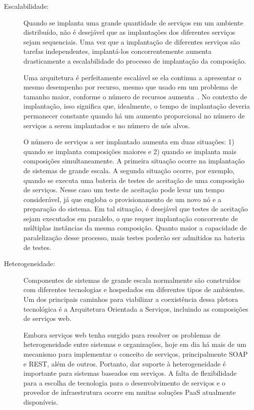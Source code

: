 \begin{description}
\item [Escalabilidade:]

Quando se implanta uma grande quantidade de serviços em um ambiente distribuído,
não é desejável que as implantações dos diferentes serviços sejam sequenciais.
Uma vez que a implantação de diferentes serviços são tarefas independentes,
implantá-los concorrentemente aumenta drasticamente a escalabilidade
do processo de implantação da composição.

Uma arquitetura é perfeitamente escalável
se ela continua a apresentar o mesmo desempenho por recurso,
mesmo que usado em um problema de tamanho maior, conforme o número
de recursos aumenta~\cite{Quinn1994Scalability}.
No contexto de implantação, isso significa que, idealmente,
o tempo de implantação deveria permanecer constante quando há um
aumento proporcional no número de serviços a serem implantados e
no número de nós alvos.

O número de serviços a ser implantado aumenta em duas situações:
1) quando se implanta composições maiores e 2) quando se implanta
mais composições simultaneamente. 
A primeira situação ocorre na implantação de sistemas de grande escala.
A segunda situação ocorre, por exemplo,
quando se executa uma bateria de testes de aceitação de uma composição de serviços.
Nesse caso um teste de aceitação pode levar um tempo considerável,
já que engloba o provisionamento de um novo nó e a preparação do sistema.
Em tal situação, é desejável que testes de aceitação sejam executados em paralelo,
o que requer implantação concorrente de múltiplas instâncias da mesma composição.
Quanto maior a capacidade de paralelização desse processo,
mais testes poderão ser admitidos na bateria de testes.

\item [Heterogeneidade:]

Componentes de sistemas de grande escala normalmente são construídos com diferentes tecnologias
e hospedados em diferentes tipos de ambientes.
Um dos principais caminhos para viabilizar a coexistência dessa pletora tecnológica
é a Arquitetura Orientada a Serviços, incluindo as composições de serviços web.

Embora serviços web tenha surgido para resolver os problemas de heterogeneidade
entre sistemas e organizações, hoje em dia há mais de um mecanismo para
implementar o conceito de serviços, principalmente SOAP e REST, além de outros.
Portanto, dar suporte à heterogeneidade é importante para sistemas baseados em serviços.
A falta de flexibilidade para a escolha de tecnologia para o desenvolvimento de serviços
e o provedor de infraestrutura ocorre em muitas soluções PaaS atualmente disponíveis.


\end{description}
